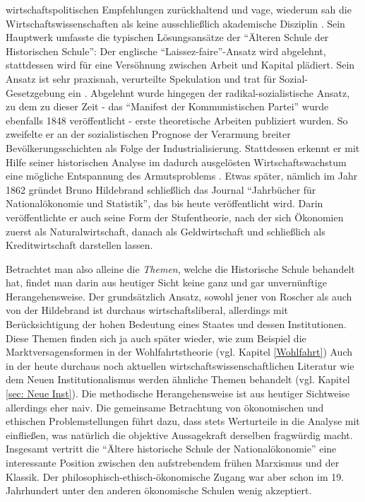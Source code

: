 wirtschaftspolitischen Empfehlungen zurückhaltend und vage, \textcite{Hildebrand1948} wiederum sah die Wirtschaftswissenschaften als keine ausschließlich akademische Disziplin \parencite{Balabkins1993}. Sein Hauptwerk umfasste die typischen Lösungsansätze der "`Älteren Schule der Historischen Schule"': Der englische "`Laissez-faire"'-Ansatz wird abgelehnt, stattdessen wird für eine Versöhnung zwischen Arbeit und Kapital plädiert. Sein Ansatz ist sehr praxisnah, verurteilte Spekulation und trat für Sozial-Gesetzgebung ein \parencite[S. 33]{Balabkins1993}. Abgelehnt wurde hingegen der radikal-sozialistische Ansatz, zu dem zu dieser Zeit - das "`Manifest der Kommunistischen Partei"' wurde ebenfalls 1848 veröffentlicht - erste theoretische Arbeiten publiziert wurden. So zweifelte er an der sozialistischen Prognose der Verarmung breiter Bevölkerungsschichten als Folge der Industrialisierung. Stattdessen erkennt er mit Hilfe seiner historischen Analyse im dadurch ausgelösten Wirtschaftswachstum eine mögliche Entspannung des Armutsproblems \parencite[S. 122]{Pierenkemper2012}. Etwas später, nämlich im Jahr 1862 gründet Bruno Hildebrand schließlich das Journal "`Jahrbücher für Nationalökonomie und Statistik"', das bis heute veröffentlicht wird. Darin veröffentlichte er auch seine Form der Stufentheorie, nach der sich Ökonomien zuerst als Naturalwirtschaft, danach als Geldwirtschaft und schließlich als Kreditwirtschaft darstellen lassen. 

Betrachtet man also alleine die \textit{Themen}, welche die Historische Schule behandelt hat, findet man darin aus heutiger Sicht keine ganz und gar unvernünftige Herangehensweise. Der grundsätzlich Ansatz, sowohl jener von Roscher als auch von der Hildebrand ist durchaus wirtschaftsliberal, allerdings mit Berücksichtigung der hohen Bedeutung eines Staates und dessen Institutionen. Diese Themen finden sich ja auch später wieder, wie zum Beispiel die Marktversagensformen in der Wohlfahrtstheorie (vgl. Kapitel \ref{Wohlfahrt}) Auch in der heute durchaus noch aktuellen wirtschaftswissenschaftlichen Literatur wie dem Neuen Institutionalismus werden ähnliche Themen behandelt (vgl. Kapitel \ref{sec: Neue Inst}). Die methodische Herangehensweise ist aus heutiger Sichtweise allerdings eher naiv. Die gemeinsame Betrachtung von ökonomischen und ethischen Problemstellungen führt dazu, dass stets Werturteile in die Analyse mit einfließen, was natürlich die objektive Aussagekraft derselben fragwürdig macht. Insgesamt vertritt die "`Ältere historische Schule der Nationalökonomie"' eine interessante Position zwischen den aufstrebendem frühen Marxismus und der Klassik. Der philosophisch-ethisch-ökonomische Zugang war aber schon im 19. Jahrhundert unter den anderen ökonomische Schulen wenig akzeptiert.

